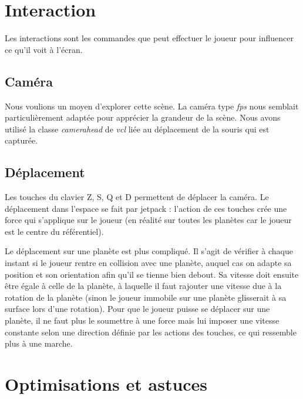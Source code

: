 \documentclass[a4paper,12pt,twoside]{article}
\begin{document}
\section{Interaction}

Les interactions sont les commandes que peut effectuer le joueur pour influencer ce qu'il voit à l'écran.

\subsection{Caméra}

Nous voulions un moyen d'explorer cette scène. La caméra type \textit{fps} nous semblait particulièrement adaptée pour apprécier la grandeur de la scène. Nous avons utilisé la classe \textit{camera\textunderscore head} de \textit{vcl} liée au déplacement de la souris qui est capturée.

\subsection{Déplacement}

Les touches du clavier Z, S, Q et D permettent de déplacer la caméra. Le déplacement dans l'espace se fait par jetpack : l'action de ces touches crée une force qui s'applique sur le joueur (en réalité sur toutes les planètes car le joueur est le centre du référentiel).

Le déplacement sur une planète est plus compliqué. Il s'agit de vérifier à chaque instant si le joueur rentre en collision avec une planète, auquel cas on adapte sa position et son orientation afin qu'il se tienne bien debout. Sa vitesse doit ensuite être égale à celle de la planète, à laquelle il faut rajouter une vitesse due à la rotation de la planète (sinon le joueur immobile sur une planète glisserait à sa surface lors d'une rotation). Pour que le joueur puisse se déplacer sur une planète, il ne faut plus le soumettre à une force mais lui imposer une vitesse constante selon une direction définie par les actions des touches, ce qui ressemble plus à une marche.

\section{Optimisations et astuces}
\end{document}
